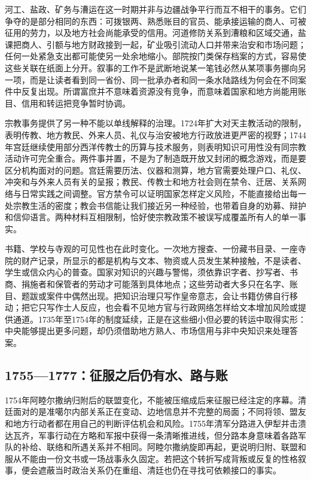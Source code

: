 河工、盐政、矿务与漕运在这一时期并非与边疆战争平行而互不相干的事务。它们争夺的是部分相同的东西：可拨银两、熟悉账目的官员、能承接运输的商人、可被征用的劳力，以及地方社会尚能承受的信用。河道修防关系到漕粮和区域交通，盐课把商人、引额与地方财政接到一起，矿业吸引流动人口并带来治安和市场问题；任何一处紧急支出都可能使另一处余地缩小。部院按门类保存档案的方式，容易使这些关联在纸面上分开。叙事的工作不是武断地说某一笔钱必然从某项事务挪向另一项，而是让读者看到同一省份、同一批承办者和同一条水陆路线为何会在不同案件中反复出现。所谓富庶并不意味着资源没有竞争，而意味着国家和地方尚能用账目、信用和转运把竞争暂时协调。

宗教事务提供了另一种不能以单线解释的治理。1724年扩大对天主教活动的限制，表明传教、地方教民、外来人员、礼仪与治安被地方行政放进更严密的视野；1744年宫廷继续使用部分西洋传教士的历算与技术服务，则表明知识可用性没有同宗教活动许可完全重合。两件事并置，不是为了制造既开放又封闭的概念游戏，而是要区分机构面对的问题。宫廷需要历法、仪器和测算，地方官需要处理户口、礼仪、冲突和与外来人员有关的呈报；教民、传教士和地方社会则在禁令、迁居、关系网络与日常实践之间调整。官方禁令可以证明国家怎样定义风险，不能直接给出每一处宗教生活的密度；教会书信能让我们接近另一种经验，也带着自身的劝募、辩护和信仰语言。两种材料互相限制，恰好使宗教政策不被误写成覆盖所有人的单一事实。

书籍、学校与寺观的可见性也在此时变化。一次地方搜查、一份藏书目录、一座寺院的财产记录，所显示的都是机构与文本、物资或人员发生某种接触，不是读者、学生或信众内心的普查。国家对知识的兴趣与警惕，须依靠识字者、抄写者、书商、捐施者和保管者的劳动才可能落到具体地点；这些劳动者大多只在名字、账目、题跋或案件中偶然出现。把知识治理只写作皇帝意志，会让书籍仿佛自行移动；把它只写作士人反应，也会看不见地方官与行政网络怎样给文本增加风险或提供通道。1735年至1754年的制度延续，正是在这些细小但必要的转运中取得实形：中央能够提出更多问题，却仍须借助地方熟人、市场信用与非中央知识来处理答案。

\subsection{1755—1777：征服之后仍有水、路与账}

1754年阿睦尔撒纳归附后的联盟变化，不能被压缩成后来征服已经注定的序幕。清廷面对的是准噶尔内部关系正在变动、边地信息并不完整的局面；不同将领、盟友和地方行动者都在用自己的判断评估机会和风险。1755年清军分路进入伊犁并击溃达瓦齐，军事行动在方略和军报中获得一条清晰推进线，但分路本身意味着各路军队的补给、联络和所遇关系并不相同。阿睦尔撒纳旋即再起，更说明归附、联盟和服从不能由一份文书或一场战事永久固定。若把这个转折写成背叛或反复的性格叙事，便会遮蔽当时政治关系仍在重组、清廷也仍在寻找可依赖接口的事实。

